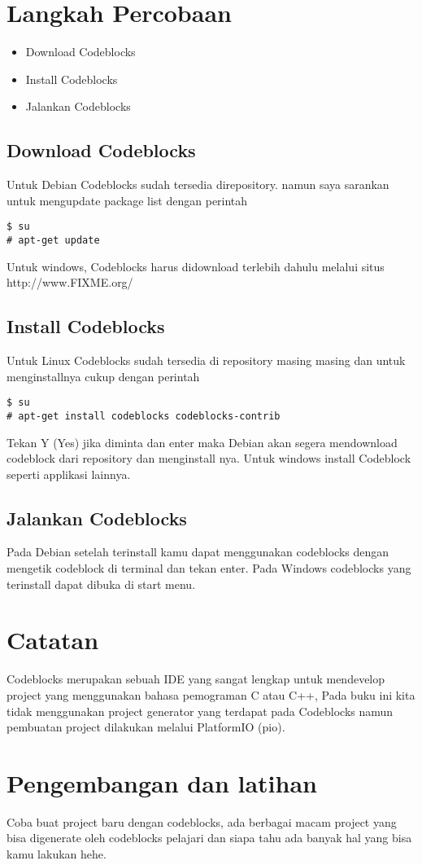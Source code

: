 \section{Langkah Percobaan}
\begin{itemize}
\item Download Codeblocks
\item Install Codeblocks
\item Jalankan Codeblocks
\end{itemize}
\subsection{Download Codeblocks}
Untuk Debian Codeblocks sudah tersedia direpository. namun saya sarankan untuk mengupdate package list dengan perintah 
\begin{lstlisting}[style=bash]
$ su
# apt-get update
\end{lstlisting}
Untuk windows, Codeblocks harus didownload terlebih dahulu melalui situs
\newline
http://www.FIXME.org/
\subsection{Install Codeblocks}
Untuk Linux Codeblocks sudah tersedia di repository masing masing dan untuk menginstallnya cukup dengan perintah 
\begin{lstlisting}[label=install-cb-apt-get,caption=Debian Install Codeblocks,style=bash]
$ su
# apt-get install codeblocks codeblocks-contrib
\end{lstlisting}
Tekan Y (Yes) jika diminta dan enter maka Debian akan segera mendownload codeblock dari repository dan menginstall nya.
\newline
Untuk windows install Codeblock seperti applikasi lainnya.
\subsection{Jalankan Codeblocks}
Pada Debian setelah terinstall kamu dapat menggunakan codeblocks dengan mengetik codeblock di terminal dan tekan enter.
\newline
Pada Windows codeblocks yang terinstall dapat dibuka di start menu.

\section{Catatan}
Codeblocks merupakan sebuah IDE yang sangat lengkap untuk mendevelop project yang menggunakan bahasa pemograman C atau C++, Pada buku ini kita tidak menggunakan project generator yang terdapat pada Codeblocks namun pembuatan project dilakukan melalui PlatformIO (pio).

\section{Pengembangan dan latihan}
Coba buat project baru dengan codeblocks, ada berbagai macam project yang bisa digenerate oleh codeblocks pelajari dan siapa tahu ada banyak hal yang bisa kamu lakukan hehe.


